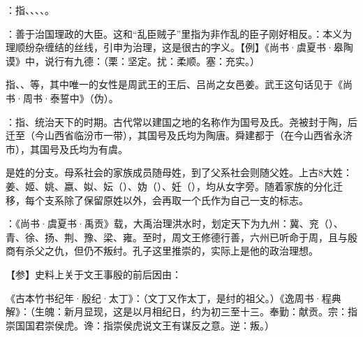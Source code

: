 {
\item {}：指、、、、。
\item {}：善于治国理政的大臣。这和“乱臣贼子”里指为非作乱的臣子刚好相反。：本义为理顺纷杂缠结的丝线，引申为治理，这是很古的字义。【例】《尚书·虞夏书·皋陶谟》中，说行有九德：（栗：坚定。扰：柔顺。塞：充实。）

指、、等，其中唯一的女性是周武王的王后、吕尚之女邑姜。武王这句话见于《尚书·周书·泰誓中》（伪）。

\item {}：指、统治天下的时期。古代常以建国之地的名称作为国号及氏。尧被封于陶，后迁至（今山西省临汾市一带），其国号及氏均为陶唐。舜建都于（在今山西省永济市），其国号及氏均为有虞。%

是姓的分支。母系社会的家族成员随母姓，到了父系社会则随父姓。上古8大姓：姜、姬、姚、嬴、姒、妘（）、妫（）、妊（），均从女字旁。随着家族的分化迁移，每个支系除了保留原姓以外，会再取一个氏作为自己一支的标志。

\item {}：《尚书·虞夏书·禹贡》载，大禹治理洪水时，划定天下为九州：冀、兖（）、青、徐、扬、荆、豫、梁、雍。至时，周文王修德行善，六州已听命于周，且与殷商有杀父之仇，但仍不叛纣。孔子这里推崇的，实际上是他的政治理想。

【参】史料上关于文王事殷的前后因由：
\begin{lyenumerate}
\item 《古本竹书纪年·殷纪·太丁》：（文丁又作太丁，是纣的祖父。）《逸周书·程典解》：（生魄：新月显现，这是以月相纪日，约为初三至十三。奉勤：献贡。宗：指崇国国君崇侯虎。谗：指崇侯虎说文王有谋反之意。逆：叛。）


\end{lyenumerate}}
